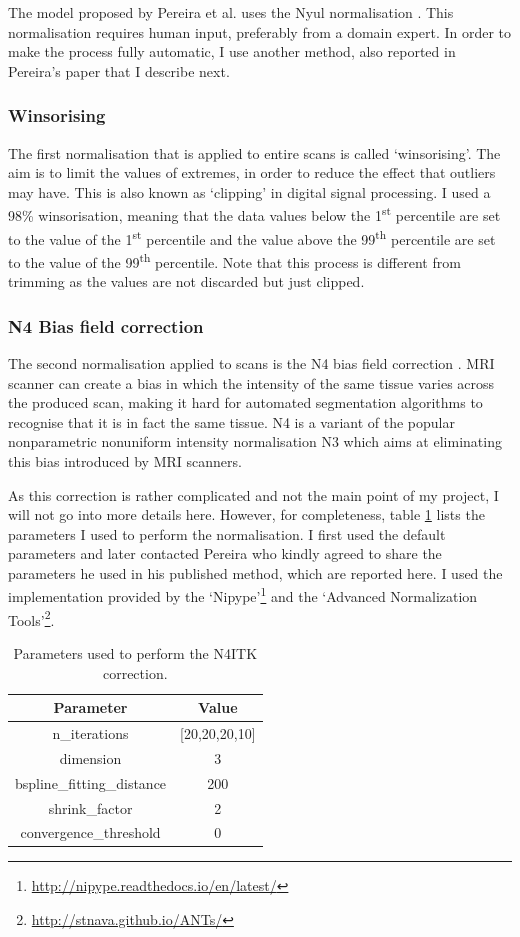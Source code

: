 \documentclass[12pt,a4paper,twoside,openright]{report}
\begin{document}
The model proposed by Pereira et al. \cite{pereira} uses the Nyul normalisation \cite{nyul}. This normalisation requires human input, preferably from a domain expert. In order to make the process fully automatic, I use another method, also reported in Pereira's paper that I describe next.

\subsubsection{Winsorising}
The first normalisation that is applied to entire scans is called `winsorising'. The aim is to limit the values of extremes, in order to reduce the effect that outliers may have. This is also known as `clipping' in digital signal processing. I used a 98\% winsorisation, meaning that the data values below the 1\textsuperscript{st} percentile are set to the value of the 1\textsuperscript{st} percentile and the value above the 99\textsuperscript{th} percentile are set to the value of the 99\textsuperscript{th} percentile. Note that this process is different from trimming as the values are not discarded but just clipped.

\subsubsection{N4 Bias field correction}
The second normalisation applied to scans is the N4 bias field correction \cite{n4itk}. MRI scanner can create a bias in which the intensity of the same tissue varies across the produced scan, making it hard for automated segmentation algorithms to recognise that it is in fact the same tissue. N4 is a variant of the popular nonparametric nonuniform intensity normalisation N3 which aims at eliminating this bias introduced by MRI scanners. 

As this correction is rather complicated and not the main point of my project, I will not go into more details here. However, for completeness, table \ref{table:n4_params} lists the parameters I used to perform the normalisation. I first used the default parameters and later contacted Pereira who kindly agreed to share the parameters he used in his published method, which are reported here. I used the implementation provided by the `Nipype'\footnote{\url{http://nipype.readthedocs.io/en/latest/}} and the `Advanced Normalization Tools'\footnote{\url{http://stnava.github.io/ANTs/}}.

\begin{table}[h]
\centering	
\begin{tabular}{ c c } 
\textbf{Parameter} & \textbf{Value} \\
 \hline
 n\_iterations & [20,20,20,10] \\ 
 dimension & 3 \\
 bspline\_fitting\_distance & 200 \\
 shrink\_factor & 2\\
 convergence\_threshold & 0
\end{tabular}
\caption{Parameters used to perform the N4ITK correction.}
\label{table:n4_params}
\end{table}
\end{document}
